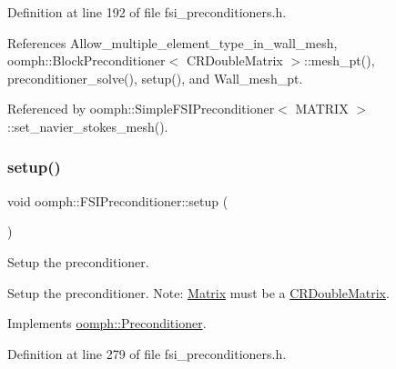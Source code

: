 Definition at line 192 of file fsi\+\_\+preconditioners.\+h.



References Allow\+\_\+multiple\+\_\+element\+\_\+type\+\_\+in\+\_\+wall\+\_\+mesh, oomph\+::\+Block\+Preconditioner$<$ C\+R\+Double\+Matrix $>$\+::mesh\+\_\+pt(), preconditioner\+\_\+solve(), setup(), and Wall\+\_\+mesh\+\_\+pt.



Referenced by oomph\+::\+Simple\+F\+S\+I\+Preconditioner$<$ M\+A\+T\+R\+I\+X $>$\+::set\+\_\+navier\+\_\+stokes\+\_\+mesh().

\mbox{\label{classoomph_1_1FSIPreconditioner_adadfe9f4332af610b00f1f45d1ad432e}} 
\subsubsection{\texorpdfstring{setup()}{setup()}}
{\footnotesize\ttfamily void oomph\+::\+F\+S\+I\+Preconditioner\+::setup (\begin{DoxyParamCaption}{ }\end{DoxyParamCaption})\hspace{0.3cm}{\ttfamily [virtual]}}



Setup the preconditioner. 

Setup the preconditioner. Note\+: \hyperlink{classoomph_1_1Matrix}{Matrix} must be a \hyperlink{classoomph_1_1CRDoubleMatrix}{C\+R\+Double\+Matrix}. 

Implements \hyperlink{classoomph_1_1Preconditioner_af4886f4efe510e5c9b0eb19422943588}{oomph\+::\+Preconditioner}.



Definition at line 279 of file fsi\+\_\+preconditioners.\+h.



